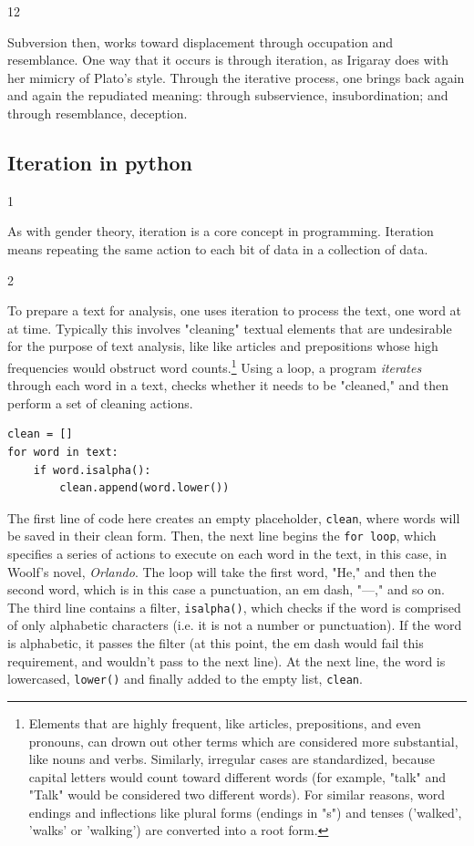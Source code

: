 \documentclass[11pt]{article}
\begin{document}
12

Subversion then, works toward displacement through occupation and
resemblance. One way that it occurs is through iteration, as Irigaray
does with her mimicry of Plato's style. Through the iterative process,
one brings back again and again the repudiated meaning: through
subservience, insubordination; and through resemblance, deception.

\subsection{Iteration in python}
\label{sec:org6695063}

1

As with gender theory, iteration is a core concept in programming.
Iteration means repeating the same action to each bit of data in a
collection of data.

2

To prepare a text for analysis, one uses iteration to process the
text, one word at at time. Typically this involves "cleaning" textual
elements that are undesirable for the purpose of text analysis, like
like articles and prepositions whose high frequencies would obstruct
word counts.\footnote{Elements that are highly frequent, like articles, prepositions,
and even pronouns, can drown out other terms which are considered more
substantial, like nouns and verbs. Similarly, irregular cases are
standardized, because capital letters would count toward different
words (for example, "talk" and "Talk" would be considered two
different words). For similar reasons, word endings and inflections
like plural forms (endings in "s") and tenses ('walked', 'walks' or
'walking') are converted into a root form.} Using a loop, a program \emph{iterates} through each
word in a text, checks whether it needs to be "cleaned," and then
perform a set of cleaning actions.

\begin{verbatim}
clean = [] 
for word in text:
    if word.isalpha():
        clean.append(word.lower())
\end{verbatim}

The first line of code here creates an empty placeholder, \texttt{clean},
where words will be saved in their clean form. Then, the next line
begins the \texttt{for loop}, which specifies a series of actions to execute
on each word in the text, in this case, in Woolf's novel, \emph{Orlando}.
The loop will take the first word, "He," and then the second word,
which is in this case a punctuation, an em dash, "---," and so on. The
third line contains a filter, \texttt{isalpha()}, which checks if the word is
comprised of only alphabetic characters (i.e. it is not a number or
punctuation). If the word is alphabetic, it passes the filter (at this
point, the em dash would fail this requirement, and wouldn't pass to
the next line). At the next line, the word is lowercased, \texttt{lower()}
and finally added to the empty list, \texttt{clean}.
\end{document}
